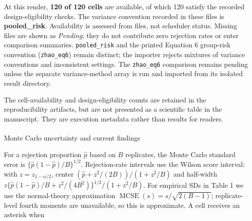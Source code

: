 \documentclass[
  12pt]{article}
\makeatletter
\let\oldparagraph\paragraph
\renewcommand{\paragraph}{
    \@ifstar
      \xxxParagraphStar
      \xxxParagraphNoStar
  }
\newcommand{\xxxParagraphStar}[1]{\oldparagraph*{#1}\mbox{}}
\newcommand{\xxxParagraphNoStar}[1]{\oldparagraph{#1}\mbox{}}
\newenvironment{Shaded}{\begin{snugshade}}{\end{snugshade}}
\newcommand{\ControlFlowTok}[1]{\textcolor[rgb]{0.00,0.23,0.31}{\textbf{#1}}}
\newcommand{\FunctionTok}[1]{\textcolor[rgb]{0.28,0.35,0.67}{#1}}
\newcommand{\NormalTok}[1]{\textcolor[rgb]{0.00,0.23,0.31}{#1}}
\newcommand{\OtherTok}[1]{\textcolor[rgb]{0.00,0.23,0.31}{#1}}
\newcommand{\SpecialCharTok}[1]{\textcolor[rgb]{0.37,0.37,0.37}{#1}}
\newcommand{\StringTok}[1]{\textcolor[rgb]{0.13,0.47,0.30}{#1}}
\makeatother
\begin{document}
\begin{Shaded}
\end{Shaded}

At this render, \textbf{120 of 120 cells} are available, of which 120
satisfy the recorded design-eligibility checks. The variance convention
recorded in these files is \textbf{pooled\_risk}. Availability is
assessed from files, not scheduler status. Missing files are shown as
\emph{Pending}; they do not contribute zero rejection rates or enter
comparison summaries. \texttt{pooled\_risk} and the printed Equation 6
group-risk convention (\texttt{zhao\_eq6}) remain distinct; the importer
rejects mixtures of variance conventions and inconsistent settings. The
\texttt{zhao\_eq6} comparison remains pending unless the separate
variance-method array is run and imported from its isolated result
directory.

The cell-availability and design-eligibility counts are retained in the
reproducibility artifacts, but are not presented as a scientific table
in the manuscript. They are execution metadata rather than results for
readers.

\paragraph{Monte Carlo uncertainty and current
findings}\label{monte-carlo-uncertainty-and-current-findings}

For a rejection proportion \(\hat p\) based on \(B\) replicates, the
Monte Carlo standard error is \(\{\hat p(1-\hat p)/B\}^{1/2}\).
Rejection-rate intervals use the Wilson score interval: with
\(z=z_{1-\alpha/2}\), center \((\hat p+z^2/(2B))/(1+z^2/B)\) and
half-width \(z\{\hat p(1-\hat p)/B+z^2/(4B^2)\}^{1/2}/(1+z^2/B)\). For
empirical SDs in Table 1 we use the normal-theory approximation
\(\operatorname{MCSE}(s)=s/\sqrt{2(B-1)}\); replicate-level fourth
moments are unavailable, so this is approximate. A cell receives an
asterisk when
\end{document}
